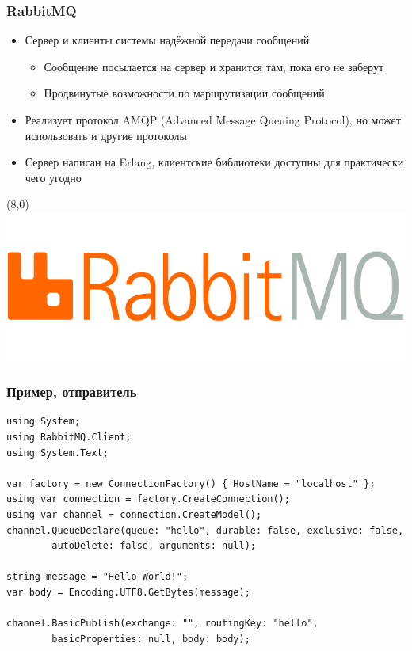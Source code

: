 \documentclass[xetex,mathserif,serif]{beamer}
\begin{document}
    \begin{frame}
        \frametitle{RabbitMQ}
        \begin{itemize}
            \item Сервер и клиенты системы надёжной передачи сообщений
            \begin{itemize}
                \item Сообщение посылается на сервер и хранится там, пока его не заберут
                \item Продвинутые возможности по маршрутизации сообщений
            \end{itemize}
            \item Реализует протокол AMQP (Advanced Message Queuing Protocol), но может использовать и другие протоколы
            \item Сервер написан на Erlang, клиентские библиотеки доступны для практически чего угодно
        \end{itemize}
        \begin{textblock}{3}(8,0)
            \includegraphics[width=\textwidth]{rabbitmqLogo.png}
        \end{textblock}
    \end{frame}

    \begin{frame}[fragile]
        \frametitle{Пример, отправитель}
        \begin{ssmall}
            \begin{verbatim}
using System;
using RabbitMQ.Client;
using System.Text;

var factory = new ConnectionFactory() { HostName = "localhost" };
using var connection = factory.CreateConnection();
using var channel = connection.CreateModel();
channel.QueueDeclare(queue: "hello", durable: false, exclusive: false,
        autoDelete: false, arguments: null);

string message = "Hello World!";
var body = Encoding.UTF8.GetBytes(message);

channel.BasicPublish(exchange: "", routingKey: "hello",
        basicProperties: null, body: body);
            \end{verbatim}
        \end{ssmall}
    \end{frame}
\end{document}
